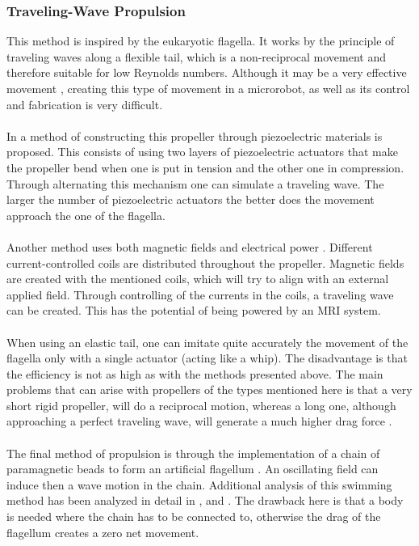 \subsubsection{Traveling-Wave Propulsion}
This method is inspired by the eukaryotic flagella. It works by the principle of traveling waves along a flexible tail, which is a non-reciprocal movement and therefore suitable for low Reynolds numbers. Although it may be a very effective movement \cite{Behkam2006}, creating this type of movement in a microrobot, as well as its control and fabrication is very difficult.\\\\
In \cite{Kosa2007} a method of constructing this propeller through piezoelectric materials is proposed. This consists of using two layers of piezoelectric actuators that make the propeller bend when one is put in tension and the other one in compression. Through alternating this mechanism one can simulate a traveling wave. The larger the number of piezoelectric actuators the better does the movement approach the one of the flagella. \\\\
Another method uses both magnetic fields and electrical power \cite{Kosa2008}. Different current-controlled coils are distributed throughout the propeller. Magnetic fields are created with the mentioned coils, which will try to align with an external applied field. Through controlling of the currents in the coils, a traveling wave can be created. This has the potential of being powered by an MRI system.\\\\
When using an elastic tail, one can imitate quite accurately the movement of the flagella only with a single actuator (acting like a whip). The disadvantage is that the efficiency is not as high as with the methods presented above. The main problems that can arise with propellers of the types mentioned here is that a very short rigid propeller, will do a reciprocal motion, whereas a long one, although approaching a perfect traveling wave, will generate a much higher drag force \cite{Nelson2010}. \\\\
The final method of propulsion is through the implementation of a chain of paramagnetic beads to form an artificial flagellum \cite{Dreyfus2005a}. An oscillating field can induce then a wave motion in the chain. Additional analysis of this swimming method has been analyzed in detail in \cite{Roper2006}, \cite{Gauger2006} and \cite{Roper2008}. The drawback here is that a body is needed where the chain has to be connected to, otherwise the drag of the flagellum creates a zero net movement.  
